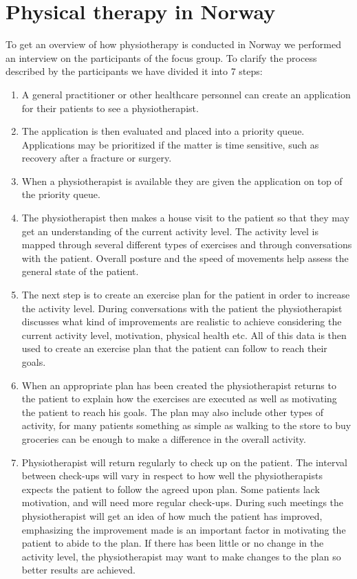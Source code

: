 \section{Physical therapy in Norway}
To get an overview of how physiotherapy is conducted in Norway we performed an interview on the participants of the focus group. To clarify the process described by the participants we have divided it into 7 steps:
\vspace{-4mm}
\begin{enumerate}
  \item A general practitioner or other healthcare personnel can create an application for their patients to see a physiotherapist.
  \item The application is then evaluated and placed into a priority queue. Applications may be prioritized if the matter is time sensitive, such as recovery after a fracture or surgery.
  \item When a physiotherapist is available they are given the application on top of the priority queue.
  \item The physiotherapist then makes a house visit to the patient so that they may get an understanding of the current activity level. The activity level is mapped through several different types of exercises and through conversations with the patient. Overall posture and the speed of movements help assess the general state of the patient.
  \item The next step is to create an exercise plan for the patient in order to increase the activity level. During conversations with the patient the physiotherapist discusses what kind of improvements are realistic to achieve considering the current activity level, motivation, physical health etc. All of this data is then used to create an exercise plan that the patient can follow to reach their goals.
  \item When an appropriate plan has been created the physiotherapist returns to the patient to explain how the exercises are executed as well as motivating the patient to reach his goals. The plan may also include other types of activity, for many patients something as simple as walking to the store to buy groceries can be enough to make a difference in the overall activity.
  \item Physiotherapist will return regularly to check up on the patient. The interval between check-ups will vary in respect to how well the physiotherapists expects the patient to follow the agreed upon plan. Some patients lack motivation, and will need more regular check-ups. During such meetings the physiotherapist will get an idea of how much the patient has improved, emphasizing the improvement made is an important factor in motivating the patient to abide to the plan. If there has been little or no change in the activity level, the physiotherapist may want to make changes to the plan so better results are achieved.
\end{enumerate}

